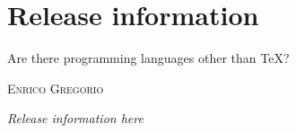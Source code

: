 \chapter*{Release information}
\label{chap:releaseinformation}

\epigraph{Are there programming languages other
than \TeX?}{\textsc{Enrico Gregorio}}

\emph{Release information here}
